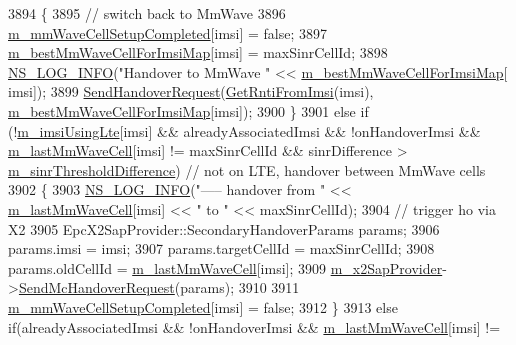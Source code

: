 \begin{DoxyCode}
3894     \{
3895       \textcolor{comment}{// switch back to MmWave}
3896       \hyperlink{classns3_1_1LteEnbRrc_ad19d6f4c123115e1d13e34609781ab20}{m\_mmWaveCellSetupCompleted}[imsi] = \textcolor{keyword}{false};
3897       \hyperlink{classns3_1_1LteEnbRrc_a38d5bf3d53b16596824f07d4b4a1eab7}{m\_bestMmWaveCellForImsiMap}[imsi] = maxSinrCellId;
3898       \hyperlink{group__logging_gafbd73ee2cf9f26b319f49086d8e860fb}{NS\_LOG\_INFO}(\textcolor{stringliteral}{"Handover to MmWave "} << \hyperlink{classns3_1_1LteEnbRrc_a38d5bf3d53b16596824f07d4b4a1eab7}{m\_bestMmWaveCellForImsiMap}[
      imsi]);
3899       \hyperlink{classns3_1_1LteEnbRrc_aafad8f02e2086dafea2bc4b48793a392}{SendHandoverRequest}(\hyperlink{classns3_1_1LteEnbRrc_a98f4b8f727e844ab621e447b7178ddc2}{GetRntiFromImsi}(imsi), 
      \hyperlink{classns3_1_1LteEnbRrc_a38d5bf3d53b16596824f07d4b4a1eab7}{m\_bestMmWaveCellForImsiMap}[imsi]);
3900     \}
3901     \textcolor{keywordflow}{else} \textcolor{keywordflow}{if} (!\hyperlink{classns3_1_1LteEnbRrc_a99427e888b10d095491e72bf062511db}{m\_imsiUsingLte}[imsi] && alreadyAssociatedImsi && !onHandoverImsi && 
      \hyperlink{classns3_1_1LteEnbRrc_a0d7b04f0383b0dc3f6a7360b87cbaeee}{m\_lastMmWaveCell}[imsi] != maxSinrCellId && sinrDifference > 
      \hyperlink{classns3_1_1LteEnbRrc_aef56a65c644f6ed3c5f28a540ded624f}{m\_sinrThresholdDifference}) \textcolor{comment}{// not on LTE, handover between MmWave cells}
3902     \{
3903       \hyperlink{group__logging_gafbd73ee2cf9f26b319f49086d8e860fb}{NS\_LOG\_INFO}(\textcolor{stringliteral}{"----- handover from "} << \hyperlink{classns3_1_1LteEnbRrc_a0d7b04f0383b0dc3f6a7360b87cbaeee}{m\_lastMmWaveCell}[imsi] << \textcolor{stringliteral}{" to "} << 
      maxSinrCellId);
3904                   \textcolor{comment}{// trigger ho via X2}
3905       EpcX2SapProvider::SecondaryHandoverParams params;
3906       params.imsi = imsi;
3907       params.targetCellId = maxSinrCellId;
3908       params.oldCellId = \hyperlink{classns3_1_1LteEnbRrc_a0d7b04f0383b0dc3f6a7360b87cbaeee}{m\_lastMmWaveCell}[imsi];
3909       \hyperlink{classns3_1_1LteEnbRrc_ae8dc75f4f6f63b7736d86204a4beb415}{m\_x2SapProvider}->\hyperlink{classns3_1_1EpcX2SapProvider_a419d10f3f7f1808938a53439bed4f9eb}{SendMcHandoverRequest}(params);
3910 
3911       \hyperlink{classns3_1_1LteEnbRrc_ad19d6f4c123115e1d13e34609781ab20}{m\_mmWaveCellSetupCompleted}[imsi] = \textcolor{keyword}{false};
3912     \}
3913     \textcolor{keywordflow}{else} \textcolor{keywordflow}{if}(alreadyAssociatedImsi && !onHandoverImsi && \hyperlink{classns3_1_1LteEnbRrc_a0d7b04f0383b0dc3f6a7360b87cbaeee}{m\_lastMmWaveCell}[imsi] != 

\end{DoxyCode}

